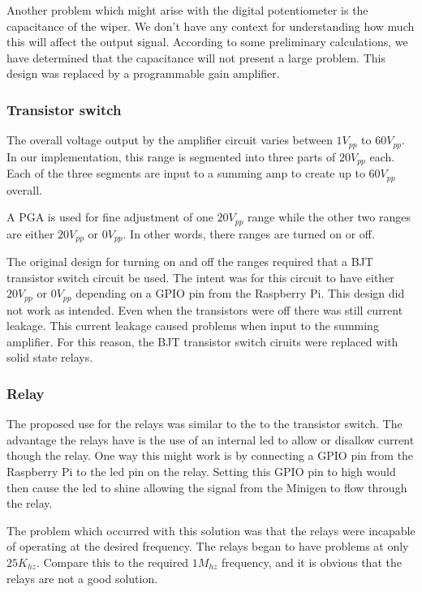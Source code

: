 \documentclass{article}	%
\begin{document}
\begin{multicols}{2}
Another problem which might arise with the digital potentiometer is the capacitance of the wiper. We don’t have any context for understanding how much this will affect the output signal. According to some preliminary calculations, we have determined that the capacitance will not present a large problem.
This design was replaced by a programmable gain amplifier.

\subsubsection{Transistor switch}
The overall voltage output by the amplifier circuit
varies between $1V_{pp}$ to $60V_{pp}$.
In our implementation,
this range is segmented into three parts of $20V_{pp}$ each.
Each of the three segments are input to a summing amp to
create up to $60V_{pp}$ overall.

A PGA is used for fine adjustment of one $20V_{pp}$ range while
the other two ranges are either $20V_{pp}$ or $0V_{pp}$.
In other words,
there ranges are turned on or off.

The original design for turning on and off the ranges
required that a BJT transistor switch circuit be used.
The intent was for this circuit to have either $20V_{pp}$ or $0V_{pp}$
depending on a GPIO pin from the Raspberry Pi.
This design did not work as intended.
Even when the transistors were off there was still current leakage.
This current leakage caused problems when input to the summing amplifier.
For this reason, the BJT transistor switch ciruits were replaced with solid state relays.

\subsubsection{Relay}
The proposed use for the relays was
similar to the to the transistor switch.
The advantage the relays have is the use
of an internal led to allow or disallow
current though the relay.
One way this might work is by
connecting a GPIO pin from the Raspberry Pi to
the led pin on the relay.
Setting this GPIO pin to high would then
cause the led to shine allowing the signal
from the Minigen to flow through the relay.

The problem which occurred with this solution
was that the relays were incapable of
operating at the desired frequency.
The relays began to have problems at only $25K_{hz}$.
Compare this to the required $1M_{hz}$ frequency, and
it is obvious that the relays are not a good solution.


\end{multicols}
\end{document}
